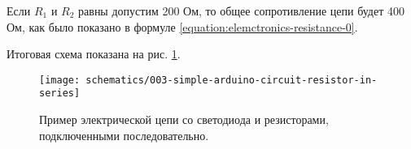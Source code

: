 \documentclass[../sparc.tex]{subfiles}
\begin{document}
Если $R_1$ и $R_2$ равны допустим 200 Ом, то общее сопротивление цепи будет 400
Ом, как было показано в формуле \ref{equation:elemctronics-resistance-0}.

Итоговая схема показана на рис.
\ref{fig:breadboard-simple-arduino-circuit-resistor-in-series}.

\begin{figure}[ht]
  \centering
  \texttt{[image: schematics/003-simple-arduino-circuit-resistor-in-series]}
  \caption{Пример электрической цепи со светодиода и резисторами, подключенными
    последовательно.}
  \label{fig:breadboard-simple-arduino-circuit-resistor-in-series}
\end{figure}
\end{document}

